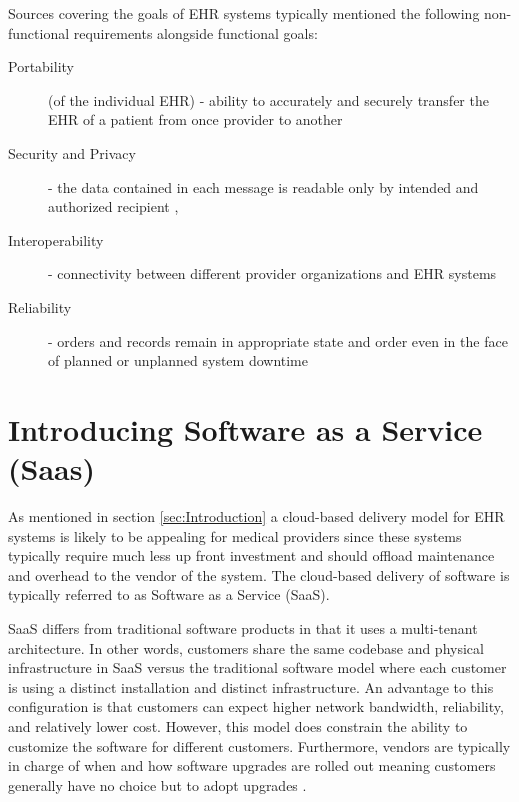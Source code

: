 \documentclass[10pt]{article}
\begin{document}
Sources covering the goals of EHR systems typically mentioned the following non-functional requirements alongside functional goals:

\begin{description}
	\item[Portability] (of the individual EHR) - ability to accurately and securely transfer the EHR of a patient from once provider to another \cite{ehrbook}
	\item[Security and Privacy] - the data contained in each message is readable only by intended and authorized recipient \cite{ehrbook}, \cite{auditingprivacy}
	\item[Interoperability] - connectivity between different provider organizations and EHR systems \cite{ehrbook}
	\item[Reliability] - orders and records remain in appropriate state and order even in the face of planned or unplanned system downtime  \cite{ehrbook}
\end{description}




\section{Introducing Software as a Service (Saas)}
\label{sec:Intro_SaaS}

As mentioned in section \ref{sec:Introduction} a cloud-based delivery model for EHR systems is likely to be appealing for medical providers since these systems typically require much less up front investment and should offload maintenance and overhead to the vendor of the system.
The cloud-based delivery of software is typically referred to as Software as a Service (SaaS).

SaaS differs from traditional software products in that it uses a multi-tenant architecture.
In other words, customers share the same codebase and physical infrastructure in SaaS versus the traditional software model where each customer is using a distinct installation and distinct infrastructure.
An advantage to this configuration is that customers can expect higher network bandwidth, reliability, and relatively lower cost.
However, this model does constrain the ability to customize the software for different customers.
Furthermore, vendors are typically in charge of when and how software upgrades are rolled out meaning customers generally have no choice but to adopt upgrades \cite{saasqual}.
\end{document}
